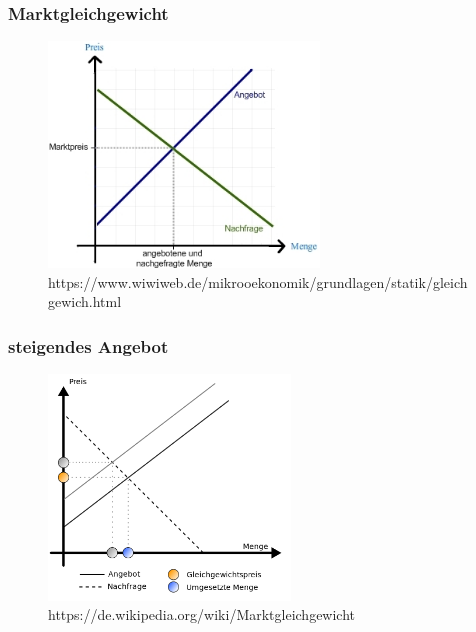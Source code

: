 \documentclass{beamer}
\begin{document}
\begin{frame}
\frametitle{Marktgleichgewicht}
  \begin{figure}[h]
    \centering
    \includegraphics[height=6cm]{marktgleichgewicht}
    \caption{https://www.wiwiweb.de/mikrooekonomik/grundlagen/statik/gleichgewich.html}
  \end{figure}
\end{frame}
\begin{frame}
\frametitle{steigendes Angebot}
  \begin{figure}[h]
    \centering
    \includegraphics[height=6cm]{steigendes_angebot}
    \caption{https://de.wikipedia.org/wiki/Marktgleichgewicht}
  \end{figure}
\end{frame}
\end{document}

